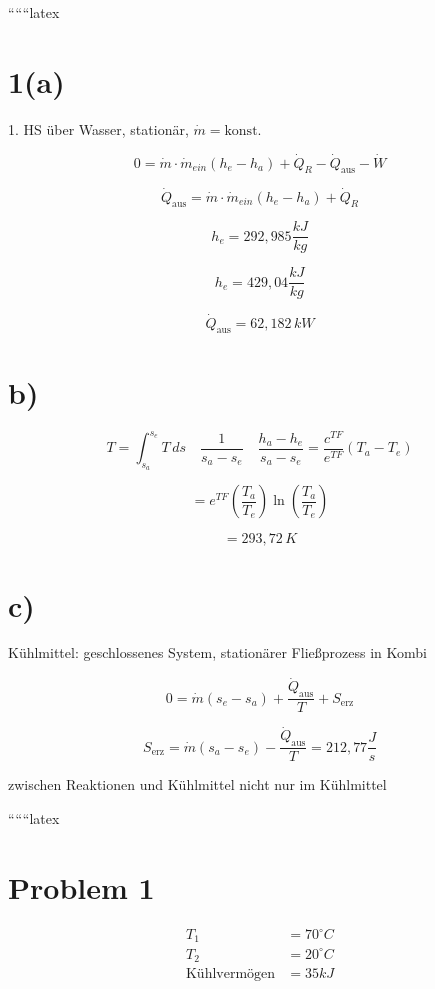 
``````latex


\section*{1(a)}

1. HS über Wasser, stationär, \( \dot{m} = \text{konst.} \)

\[
0 = \dot{m} \cdot \dot{m}_{ein} (h_e - h_a) + \dot{Q}_R - \dot{Q}_{\text{aus}} - \dot{W}
\]

\[
\dot{Q}_{\text{aus}} = \dot{m} \cdot \dot{m}_{ein} (h_e - h_a) + \dot{Q}_R
\]

\[
h_e = 292,985 \frac{kJ}{kg}
\]

\[
h_e = 429,04 \frac{kJ}{kg}
\]

\[
\dot{Q}_{\text{aus}} = 62,182 \, kW
\]

\section*{b)}

\[
T = \int_{s_a}^{s_e} T \, ds \quad \frac{1}{s_a - s_e} \quad \frac{h_a - h_e}{s_a - s_e} = \frac{c^{TF}}{e^{TF}} (T_a - T_e)
\]

\[
= e^{TF} \left( \frac{T_a}{T_e} \right) \ln \left( \frac{T_a}{T_e} \right)
\]

\[
= 293,72 \, K
\]

\section*{c)}

Kühlmittel: geschlossenes System, stationärer Fließprozess in Kombi

\[
0 = \dot{m} (s_e - s_a) + \frac{\dot{Q}_{\text{aus}}}{T} + S_{\text{erz}}
\]

\[
S_{\text{erz}} = \dot{m} (s_a - s_e) - \frac{\dot{Q}_{\text{aus}}}{T} = 212,77 \frac{J}{s}
\]

zwischen Reaktionen und Kühlmittel nicht nur im Kühlmittel

``````latex


\section*{Problem 1}

\begin{align*}
T_1 &= 70^\circ C \\
T_2 &= 20^\circ C \\
\text{Kühlvermögen} &= 35kJ
\end{align*}

